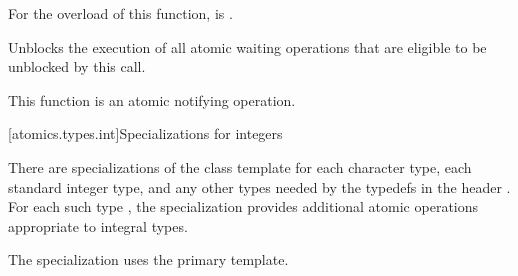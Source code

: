 \begin{itemdescr}
\pnum
\constraints
For the  overload of this function,
 is .

\pnum
\effects
Unblocks the execution of all atomic waiting operations
that are eligible to be unblocked by this call.

\pnum
\remarks
This function is an atomic notifying operation.
\end{itemdescr}

[atomics.types.int]{Specializations for integers}

%
\pnum
There are specializations of the 
class template for
each character type,
each standard integer type, and
any other types needed by the typedefs in the header .
For each such type , the specialization
 provides additional atomic operations appropriate to integral types.
\begin{note}
The specialization 
uses the primary template.
\end{note}

